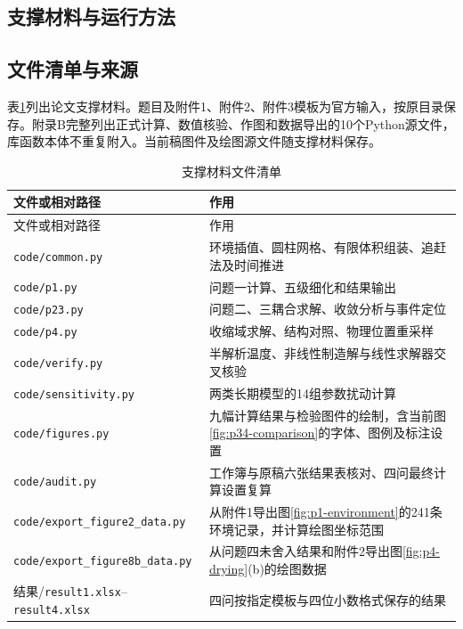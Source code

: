 \clearpage
\begin{appendices}
\renewcommand{\thesubsection}{\Alph{section}.\arabic{subsection}}
\section{支撑材料与运行方法}
\label{sec:appendix-materials}
\subsection{文件清单与来源}
表\ref{tab:files}列出论文支撑材料。题目及附件1、附件2、附件3模板为官方输入，按原目录保存。附录B完整列出正式计算、数值核验、作图和数据导出的10个Python源文件，库函数本体不重复附入。当前稿图件及绘图源文件随支撑材料保存。

\begin{longtable}{@{}>{\raggedright\arraybackslash}p{}>{\raggedright\arraybackslash}p{}@{}}
\caption{支撑材料文件清单}\label{tab:files}\\
\toprule 文件或相对路径&作用\\\midrule\endfirsthead
\toprule 文件或相对路径&作用\\\midrule\endhead
\bottomrule\endfoot
\texttt{code/common.py}&环境插值、圆柱网格、有限体积组装、追赶法及时间推进\\
\texttt{code/p1.py}&问题一计算、五级细化和结果输出\\
\texttt{code/p23.py}&问题二、三耦合求解、收敛分析与事件定位\\
\texttt{code/p4.py}&收缩域求解、结构对照、物理位置重采样\\
\texttt{code/verify.py}&半解析温度、非线性制造解与线性求解器交叉核验\\
\texttt{code/sensitivity.py}&两类长期模型的14组参数扰动计算\\
\texttt{code/figures.py}&九幅计算结果与检验图件的绘制，含当前图\ref{fig:p34-comparison}的字体、图例及标注设置\\
\texttt{code/audit.py}&工作簿与原稿六张结果表核对、四问最终计算设置复算\\
\texttt{code/}\allowbreak\texttt{export\_figure2\_data.py}&从附件1导出图\ref{fig:p1-environment}的241条环境记录，并计算绘图坐标范围\\
\texttt{code/}\allowbreak\texttt{export\_figure8b\_data.py}&从问题四未舍入结果和附件2导出图\ref{fig:p4-drying}(b)的绘图数据\\
结果/\texttt{result1.xlsx}--\texttt{result4.xlsx}&四问按指定模板与四位小数格式保存的结果\\

\end{longtable}
\end{appendices}
